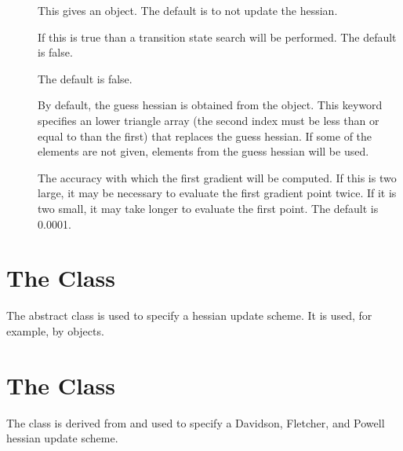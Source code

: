 \begin{description}
  \item[] This gives an  object.
     The default is to not update the hessian.

  \item[] If this is true than a transition
     state search will be performed. The default is false.

  \item[] The default is false.

  \item[] By default, the guess hessian is obtained from the
      object.  This keyword specifies an lower triangle
     array (the second index must be less than or equal to than the first)
     that replaces the guess hessian.  If some of the elements are not
     given, elements from the guess hessian will be used.

  \item[] The accuracy with which the first gradient will
     be computed.  If this is two large, it may be necessary to evaluate
     the first gradient point twice.  If it is two small, it may take
     longer to evaluate the first point. The default is 0.0001.

\end{description}


\section{The  Class}\label{HessianUpdate}

The  abstract class is used to specify a
hessian update scheme.  It is used, for example, by
 objects.


\section{The  Class}\label{DFPUpdate}

The  class is derived from  and
used to specify a Davidson, Fletcher, and Powell hessian update scheme.

